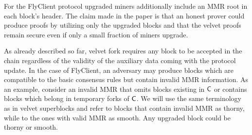%

	For the FlyClient protocol upgraded miners additionally include an MMR root in each block's header.
    The claim made in the paper is that an honest prover could produce proofs
    by utilizing only the upgraded blocks and that the velvet proofs remain secure even if only a small fraction of miners upgrade. 

	As already described so far, velvet fork requires any block to be accepted in the chain regardless of the validity of the auxiliary data coming with the protocol update.
    In the case of FlyClient, an adversary may produce blocks which are compatible to the basic consensus rules but contain invalid MMR information.
    As an example, consider an invalid MMR that omits blocks existing in $\mathsf{C}$ or contains blocks which belong in temporary forks of $\mathsf{C}$.
    We will use the same terminology as in velvet superblocks and refer to blocks that contain invalid MMR as thorny, while to the ones with valid MMR as smooth.
    Any upgraded block could be thorny or smooth.

